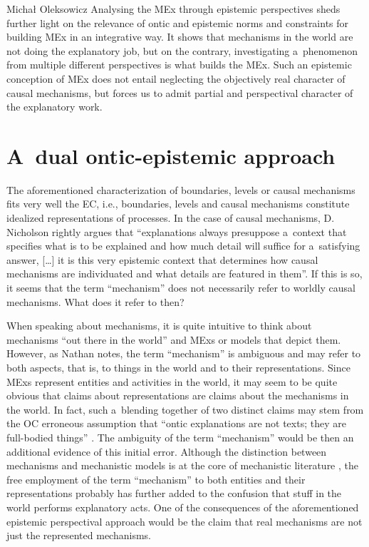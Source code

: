\begin{artengenv}{Michał Oleksowicz}
Analysing the MEx through epistemic perspectives sheds further light on the relevance of ontic and epistemic norms and constraints for building MEx in an integrative way. It shows that mechanisms in the world are not doing the explanatory job, but on the contrary, investigating a~phenomenon from multiple different perspectives is what builds the MEx. Such an epistemic conception of MEx does not entail neglecting the objectively real character of causal mechanisms, but forces us to admit partial and perspectival character of the explanatory work.

\section{A~dual ontic-epistemic approach }
The aforementioned characterization of boundaries, levels or causal mechanisms fits very well the EC, i.e., boundaries, levels and causal mechanisms constitute idealized representations of processes. In the case of causal mechanisms, D. Nicholson
\parencite*[][p.160]{nicholson_concept_2012} %
 rightly argues that ``explanations always presuppose a~context that specifies what is to be explained and how much detail will suffice for a~satisfying answer, […] it is this very epistemic context that determines how causal mechanisms are individuated and what details are featured in them''. If this is so, it seems that the term ``mechanism'' does not necessarily refer to worldly causal mechanisms. What does it refer to then?

When speaking about mechanisms, it is quite intuitive to think about mechanisms ``out there in the world'' and MExs or models that depict them. However, as Nathan
\parencite[][pp.171–172]{nathan_black_2021} %
 notes, the term ``mechanism'' is ambiguous and may refer to both aspects, that is, to things in the world and to their representations. Since MExs represent entities and activities in the world, it may seem to be quite obvious that claims about representations are claims about the mechanisms in the world. In fact, such a~blending together of two distinct claims may stem from the OC erroneous assumption that ``ontic explanations are not texts; they are full-bodied things'' 
\parencite[][p.40]{kaiser_ontic_2014}. %
 The ambiguity of the term ``mechanism'' would be then an additional evidence of this initial error. Although the distinction between mechanisms and mechanistic models is at the core of mechanistic literature 
\parencite[][]{glennan_modeling_2005}, %
 the free employment of the term ``mechanism'' to both entities and their representations probably has further added to the confusion that stuff in the world performs explanatory acts. One of the consequences of the aforementioned epistemic perspectival approach would be the claim that real mechanisms are not just the represented mechanisms.


\end{artengenv}
